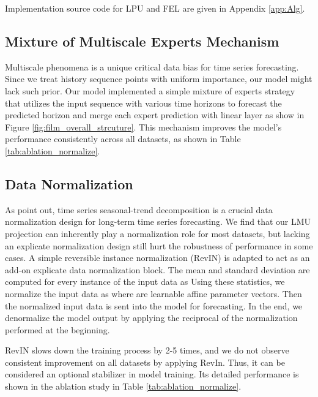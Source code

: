 \documentclass{article}
\begin{document}
Implementation source code for LPU and FEL are given in Appendix \ref{app:Alg}.


\subsection{Mixture of Multiscale Experts Mechanism}\vspace{-1mm}
Multiscale phenomena is a unique critical data bias for time series forecasting. Since we treat history sequence points with uniform importance, our model might lack such prior. Our model implemented a simple mixture of experts strategy that utilizes the input sequence with various time horizons  to forecast the predicted horizon  and merge each expert prediction with linear layer as show in Figure \ref{fig:film_overall_strcuture}. This mechanism improves the model's performance consistently across all datasets, as shown in Table \ref{tab:ablation_normalize}.



\subsection{Data Normalization}\vspace{-1mm}
As \cite{Autoformer,FedFormer} point out, time series seasonal-trend decomposition is a crucial data normalization design for long-term time series forecasting. We find that our LMU projection can inherently play a normalization role for most datasets, but lacking an explicate normalization design still hurt the robustness of performance in some cases. A simple reversible instance normalization (RevIN) \cite{reversible} is adapted to act as an add-on explicate data normalization block. 
The mean and standard deviation are computed for every instance  of the input data as
\scalebox{0.8}{}
Using these statistics, we normalize the input data   as
\scalebox{0.8}{}
where  are learnable affine parameter vectors. 
Then the normalized input data is sent into the model for forecasting. In the end, we denormalize the model output by applying the reciprocal of the normalization performed at the beginning. 

RevIN slows down the training process by 2-5 times, and we do not observe consistent improvement on all datasets by applying RevIn. Thus, it can be considered an optional stabilizer in model training. Its detailed performance is shown in the ablation study in Table \ref{tab:ablation_normalize}.
\end{document}
